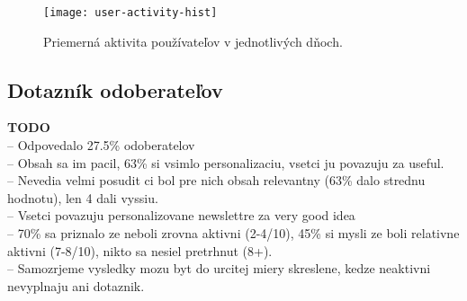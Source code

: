 \begin{figure}[H]\begin{center}
\texttt{[image: user-activity-hist]}
\caption{Priemerná aktivita používateľov v jednotlivých dňoch. \label{fig:user-act-hist}}\end{center}
\end{figure}



\subsection{Dotazník odoberateľov}

\textbf{TODO}\\
-- Odpovedalo 27.5\% odoberatelov\\
-- Obsah sa im pacil, 63\% si vsimlo personalizaciu, vsetci ju povazuju za useful.\\
-- Nevedia velmi posudit ci bol pre nich obsah relevantny (63\% dalo strednu hodnotu), len 4 dali vyssiu.\\
-- Vsetci povazuju personalizovane newslettre za very good idea\\
-- 70\% sa priznalo ze neboli zrovna aktivni (2-4/10), 45\% si mysli ze boli relativne aktivni (7-8/10), nikto sa nesiel pretrhnut (8+).\\
-- Samozrjeme vysledky mozu byt do urcitej miery skreslene, kedze neaktivni nevyplnaju ani dotaznik.

